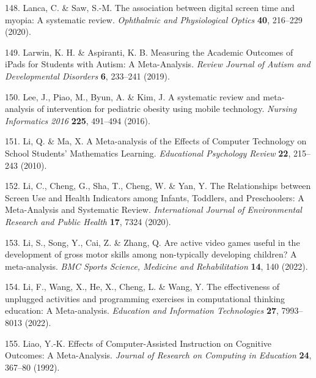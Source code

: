 \documentclass[
  english,
  man]{apa6}
\newenvironment{cslreferences}%
  {}%
  {\par}
\begin{document}
\begin{cslreferences}
\leavevmode\hypertarget{ref-lancaAssociationDigitalScreen2020}{}%
148. Lanca, C. \& Saw, S.-M. The association between digital screen time and myopia: A systematic review. \emph{Ophthalmic and Physiological Optics} \textbf{40}, 216--229 (2020).

\leavevmode\hypertarget{ref-larwinMeasuringAcademicOutcomes2019}{}%
149. Larwin, K. H. \& Aspiranti, K. B. Measuring the Academic Outcomes of iPads for Students with Autism: A Meta-Analysis. \emph{Review Journal of Autism and Developmental Disorders} \textbf{6}, 233--241 (2019).

\leavevmode\hypertarget{ref-leeSystematicReviewMetaanalysis2016}{}%
150. Lee, J., Piao, M., Byun, A. \& Kim, J. A systematic review and meta-analysis of intervention for pediatric obesity using mobile technology. \emph{Nursing Informatics 2016} \textbf{225}, 491--494 (2016).

\leavevmode\hypertarget{ref-liMetaanalysisEffectsComputer2010}{}%
151. Li, Q. \& Ma, X. A Meta-analysis of the Effects of Computer Technology on School Students' Mathematics Learning. \emph{Educational Psychology Review} \textbf{22}, 215--243 (2010).

\leavevmode\hypertarget{ref-liRelationshipsScreenUse2020}{}%
152. Li, C., Cheng, G., Sha, T., Cheng, W. \& Yan, Y. The Relationships between Screen Use and Health Indicators among Infants, Toddlers, and Preschoolers: A Meta-Analysis and Systematic Review. \emph{International Journal of Environmental Research and Public Health} \textbf{17}, 7324 (2020).

\leavevmode\hypertarget{ref-liAreActiveVideo2022}{}%
153. Li, S., Song, Y., Cai, Z. \& Zhang, Q. Are active video games useful in the development of gross motor skills among non-typically developing children? A meta-analysis. \emph{BMC Sports Science, Medicine and Rehabilitation} \textbf{14}, 140 (2022).

\leavevmode\hypertarget{ref-liEffectivenessUnpluggedActivities2022}{}%
154. Li, F., Wang, X., He, X., Cheng, L. \& Wang, Y. The effectiveness of unplugged activities and programming exercises in computational thinking education: A Meta-analysis. \emph{Education and Information Technologies} \textbf{27}, 7993--8013 (2022).

\leavevmode\hypertarget{ref-liaoEffectsComputerassistedInstruction1992}{}%
155. Liao, Y.-K. Effects of Computer-Assisted Instruction on Cognitive Outcomes: A Meta-Analysis. \emph{Journal of Research on Computing in Education} \textbf{24}, 367--80 (1992).


\end{cslreferences}
\end{document}
